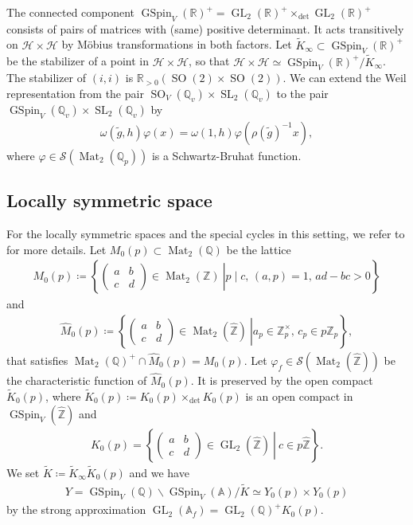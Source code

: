 \documentclass[11pt]{article} %
\newcommand{\8}{\infty}
\newcommand{\Z}{\mathbb{Z}}
\newcommand{\GSpin}{\operatorname{GSpin}}
\newcommand{\SO}{\operatorname{SO}}
\newcommand{\SL}{\operatorname{SL}}
\newcommand{\GL}{\operatorname{GL}}
\newcommand{\gtil}{\tilde{g}}
\newcommand{\Ktil}{\widetilde{K}}
\newcommand{\HH}{\mathscr{H}}
\newcommand{\R}{\mathbb{R}}
\newcommand{\A}{\mathbb{A}}
\newcommand{\Q}{\mathbb{Q}}
\newcommand{\Scal}{\mathcal{S}}
\newcommand{\Mat}{\operatorname{Mat}}
\newcommand{\fin}{f}
\theoremstyle{mytheoremstyle}
\theoremstyle{remark}
\numberwithin{equation}{section}
\begin{document}
The connected component $\GSpin_V(\R)^+=\GL_2(\R)^+ \times_{\det} \GL_2(\R)^+$ consists of pairs of matrices with (same) positive determinant. It acts transitively on $\HH \times \HH$ by Möbius transformations in both factors. Let $\Ktil_\8 \subset \GSpin_V(\R)^+$ be the stabilizer of a point in $\HH \times \HH$, so that $\HH \times \HH \simeq \GSpin_V(\R)^+ / \Ktil_\8$.
The stabilizer of $(i,i)$ is $\R_{>0} (\SO(2) \times \SO(2))$. We can extend the Weil representation from the pair $\SO_V(\Q_v) \times \SL_2(\Q_v)$ to the pair $\GSpin_V(\Q_v) \times \SL_2(\Q_v)$ by 
 \begin{align}     \omega(\gtil,h)\varphi(x)=\omega(1,h)\varphi(\rho(\gtil)^{-1}x),
 \end{align}
where $\varphi \in \Scal(\Mat_2(\Q_p))$ is a Schwartz-Bruhat function.

\subsection{Locally symmetric space} For the locally symmetric spaces and the special cycles in this setting, we refer to \cite{rbrforum} for more details. Let $M_0(p) \subset \Mat_2(\Q)$ be the lattice
\begin{align}
    M_0(p) \coloneqq \left \{ \left . \begin{pmatrix}
    a & b \\ c & d
    \end{pmatrix} \in \Mat_2(\Z) \ \right \vert p \mid c, \, (a,p)=1, \, ad-bc>0\right \}
\end{align}
and
 \begin{align}
     \widehat{M}_0(p) \coloneqq \left \{ \left . \begin{pmatrix}
    a & b \\ c & d
    \end{pmatrix} \in \Mat_2(\widehat{\Z})  \ \right \vert a_p \in \Z_p^\times, \, c_p \in p\Z_p \right \},
     \end{align}
that satisfies $\Mat_2(\Q)^+ \cap \widehat{M}_0(p)=M_0(p)$. Let $\varphi_\fin \in \Scal(\Mat_2(\widehat{\Z}))$ be the characteristic function of $\widehat{M}_0(p)$. It is preserved by the open compact $\Ktil_0(p)$, where $\Ktil_0(p) \coloneqq K_0(p) \times_{\det} K_0(p)$ is an open compact in $\GSpin_V(\widehat{\Z})$ and
\begin{align}
K_0(p)=\left \{ \left . \begin{pmatrix}
 a & b \\ c & d
\end{pmatrix} \in \GL_2(\widehat{\Z}) \ \right \vert \  c \in p\widehat{\Z} \right \}. 
\end{align}
We set $\Ktil \coloneqq \Ktil_\8 \Ktil_0(p)$ and we have
\begin{align}
    Y = \GSpin_V(\Q) \backslash \GSpin_V(\A)/\Ktil \nonumber \simeq Y_0(p) \times Y_0(p)
\end{align}
by the strong approximation $\GL_2(\A_\fin)=\GL_2(\Q)^+K_0(p)$.
\end{document}
